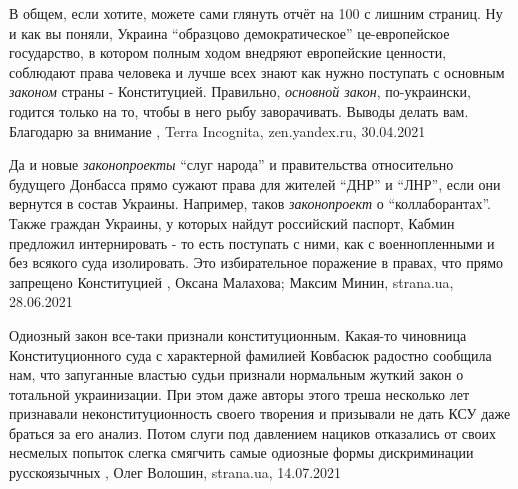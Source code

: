 В общем, если хотите, можете сами глянуть отчёт на 100 с лишним страниц. Ну и
как вы поняли, Украина \enquote{образцово демократическое} це-европейское государство,
в котором полным ходом внедряют европейские ценности, соблюдают права человека
и лучше всех знают как нужно поступать с основным \emph{законом} страны -
Конституцией. Правильно, \emph{основной закон}, по-украински, годится только на то,
чтобы в него рыбу заворачивать.  Выводы делать вам. Благодарю за внимание
, 
Terra Incognita, zen.yandex.ru, 30.04.2021

Да и новые \emph{законопроекты} \enquote{слуг народа} и правительства
относительно будущего Донбасса прямо сужают права для жителей \enquote{ДНР} и
\enquote{ЛНР}, если они вернутся в состав Украины. Например, таков
\emph{законопроект} о \enquote{коллаборантах}. Также граждан Украины, у
которых найдут российский паспорт, Кабмин предложил интернировать - то есть
поступать с ними, как с военнопленными и без всякого суда изолировать. Это
избирательное поражение в правах, что прямо запрещено Конституцией
, 
Оксана Малахова; Максим Минин, strana.ua, 28.06.2021

Одиозный закон все-таки признали конституционным.  Какая-то чиновница
Конституционного суда с характерной фамилией Ковбасюк радостно сообщила нам,
что запуганные властью судьи признали нормальным жуткий закон о тотальной
украинизации. При этом даже авторы этого треша несколько лет признавали
неконституционность своего творения и призывали не дать КСУ даже браться за его
анализ.  Потом слуги под давлением нациков отказались от своих несмелых попыток
слегка смягчить самые одиозные формы дискриминации русскоязычных
, 
Олег Волошин, strana.ua, 14.07.2021
